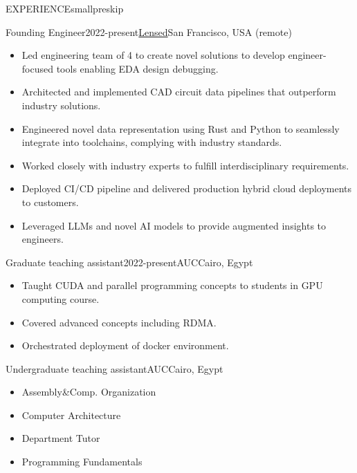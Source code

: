 \documentclass{resume}
\begin{document}
\begin{minipage}[t]{0.45\textwidth}
	\begin{rsection}{\MakeUppercase{experience}}{smallpreskip}
		\begin{rcontent}{Founding Engineer}{2022-present}{\href{https://lensed.app/}{Lensed}}{San Francisco, USA (remote)}
		\begin{itemize}
			\item Led engineering team of 4 to create novel solutions to develop engineer-focused tools enabling EDA design debugging.
			\item Architected and implemented CAD circuit data pipelines that outperform industry solutions.
			\item Engineered novel data representation using Rust and Python to seamlessly integrate into toolchains, complying with industry standards.
			\item Worked closely with industry experts to fulfill interdisciplinary requirements.
			\item Deployed CI/CD pipeline and delivered production hybrid cloud deployments to customers.
			\item Leveraged LLMs and novel AI models to provide augmented insights to engineers.
		\end{itemize}
		\end{rcontent}
		\divider
		\begin{rcontent}{Graduate teaching assistant}{2022-present}{AUC}{Cairo, Egypt}
			\begin{itemize}
				\item Taught CUDA and parallel programming concepts to students in GPU computing course.
				\item Covered advanced concepts including RDMA.
				\item Orchestrated deployment of docker environment.
			\end{itemize}
		\end{rcontent}
		\divider
		\begin{rcontent}{Undergraduate teaching assistant}{}{AUC}{Cairo, Egypt}
			\begin{itemize}
				\item Assembly\&Comp. Organization 
				\item Computer Architecture 
				\item Department Tutor 
				\item Programming Fundamentals 
			\end{itemize}
		\end{rcontent}

\end{rsection}
\end{minipage}
\end{document}
